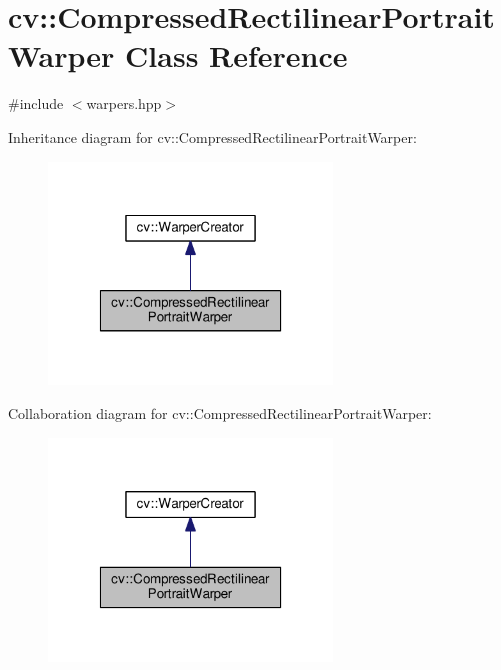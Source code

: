 \hypertarget{classcv_1_1CompressedRectilinearPortraitWarper}{\section{cv\-:\-:Compressed\-Rectilinear\-Portrait\-Warper Class Reference}
\label{classcv_1_1CompressedRectilinearPortraitWarper}
}


{\ttfamily \#include $<$warpers.\-hpp$>$}



Inheritance diagram for cv\-:\-:Compressed\-Rectilinear\-Portrait\-Warper\-:\nopagebreak
\begin{figure}[H]
\begin{center}
\leavevmode
\includegraphics[width=214pt]{classcv_1_1CompressedRectilinearPortraitWarper__inherit__graph}
\end{center}
\end{figure}


Collaboration diagram for cv\-:\-:Compressed\-Rectilinear\-Portrait\-Warper\-:\nopagebreak
\begin{figure}[H]
\begin{center}
\leavevmode
\includegraphics[width=214pt]{classcv_1_1CompressedRectilinearPortraitWarper__coll__graph}
\end{center}
\end{figure}
